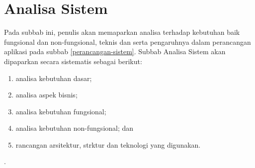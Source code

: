 \section{Analisa Sistem}
	Pada subbab ini, penulis akan memaparkan analisa terhadap kebutuhan baik fungsional dan non-fungsional, teknis dan serta pengaruhnya dalam perancangan aplikasi pada subbab \ref{perancangan-sistem}. Subbab Analisa Sistem akan dipaparkan secara sistematis sebagai berikut:
	\begin{enumerate}[label=\alph*.]
		\item analisa kebutuhan dasar;
		\item analisa aspek bisnis;
		\item analisa kebutuhan fungsional;
		\item analisa kebutuhan non-fungsional; dan
		\item rancangan arsitektur, strktur dan teknologi yang digunakan.
	\end{enumerate}.
	
	
	
	
	
	
	
	
	
	
